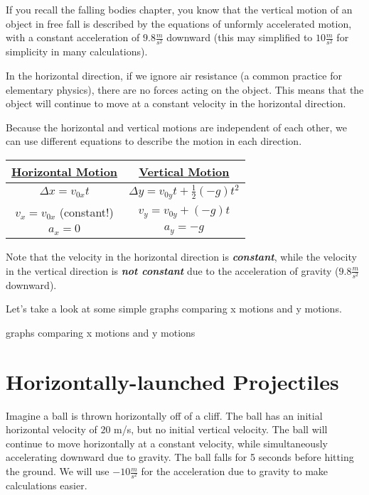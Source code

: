 If you recall the falling bodies chapter, you know that the vertical motion of an object in free fall is described by the equations of unformly accelerated motion, with a constant acceleration of $9.8 \frac{m}{s^2}$ downward (this may simplified to $10 \frac{m}{s^2}$ for simplicity in many calculations).

In the horizontal direction, if we ignore air resistance (a common practice for elementary physics), there are no forces acting on the object. This means that the object will continue to move at a constant velocity in the horizontal direction.

Because the horizontal and vertical motions are independent of each other, we can use different equations to describe the motion in each direction.

\begin{center}
    \begin{table}[]
    \begin{tabular}{|c| c|}
        \underline{Horizontal Motion}       & \underline{Vertical Motion}  \\
        \hline
    
    $\Delta x = v_{0x} t$      & $\Delta y = v_{0y} t + \frac{1}{2} (-g) t^2$  \\
    $v_x = v_{0x}$ (constant!) & $v_y = v_{0y} + (-g) t$   \\
    $a_x = 0$                & $a_y = -g$ 
    
    \end{tabular}
    \end{table}
    
\end{center}

Note that the velocity in the horizontal direction is \emph{\textbf{constant}}, while the velocity in the vertical direction is \emph{\textbf{not constant}} due to the acceleration of gravity ($9.8 \frac{m}{s^2}$ downward).

Let's take a look at some simple graphs comparing x motions and y motions.

\begin{tikzpicture}
    
\end{tikzpicture}

graphs comparing x motions and y motions

\section{Horizontally-launched Projectiles}
Imagine a ball is thrown horizontally off of a cliff. The ball has an initial horizontal velocity of $20$ m/s, but no initial vertical velocity. The ball will continue to move horizontally at a constant velocity, while simultaneously accelerating downward due to gravity. The ball falls for 5 seconds before hitting the ground. We will use $-10 \frac{m}{s^2}$ for the acceleration due to gravity to make calculations easier.

